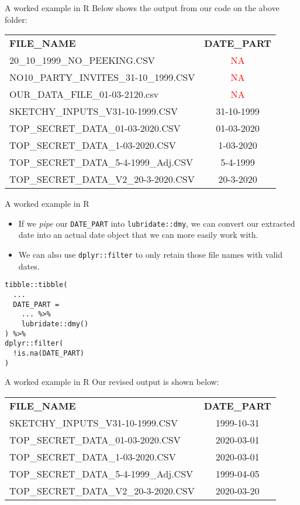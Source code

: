 \documentclass[
	usenames,
	dvipsnames,
] {beamer}
\begin{document}
\begin{frame}{A worked example in R}
	Below shows the output from our code on the above folder: \\
	\medskip
	\begin{center}
		\begin{tabular}{l c}
			\textbf{FILE\_NAME} & \textbf{DATE\_PART} \\	
			20\_10\_1999\_NO\_PEEKING.CSV & \textcolor{red}{NA} \\
			NO10\_PARTY\_INVITES\_31-10\_1999.CSV & \textcolor{red}{NA} \\
			OUR\_DATA\_FILE\_01-03-2120.csv & \textcolor{red}{NA} \\
			SKETCHY\_INPUTS\_V31-10-1999.CSV & 31-10-1999 \\
			TOP\_SECRET\_DATA\_01-03-2020.CSV & 01-03-2020 \\
			TOP\_SECRET\_DATA\_1-03-2020.CSV & 1-03-2020 \\
			TOP\_SECRET\_DATA\_5-4-1999\_Adj.CSV & 5-4-1999 \\
			TOP\_SECRET\_DATA\_V2\_20-3-2020.CSV & 20-3-2020
		\end{tabular}
	\end{center}
\end{frame}

\begin{frame}[fragile]{A worked example in R}
	\begin{itemize}[label=\textbullet]
		\item If we \emph{pipe} our \texttt{DATE\_PART} into \texttt{lubridate::dmy}, we can convert our extracted date into an actual date object that we can more easily work with.
			\pause
		\item We can also use \texttt{dplyr::filter} to only retain those file names with valid dates.
			\pause
	\end{itemize}

	\medskip
		
	\begin{lstlisting}
tibble::tibble(
  ...
  DATE_PART =
    ... %>%
    lubridate::dmy()    
) %>%
dplyr::filter(
  !is.na(DATE_PART)
)
	\end{lstlisting}
\end{frame}

\begin{frame}{A worked example in R}
	Our revised output is shown below: \\
	\medskip
	\begin{center}
		\begin{tabular}{l c}
			\textbf{FILE\_NAME} & \textbf{DATE\_PART} \\	
			SKETCHY\_INPUTS\_V31-10-1999.CSV & 1999-10-31 \\
			TOP\_SECRET\_DATA\_01-03-2020.CSV & 2020-03-01 \\
			TOP\_SECRET\_DATA\_1-03-2020.CSV & 2020-03-01 \\
			TOP\_SECRET\_DATA\_5-4-1999\_Adj.CSV & 1999-04-05 \\
			TOP\_SECRET\_DATA\_V2\_20-3-2020.CSV & 2020-03-20
		\end{tabular}
	\end{center}
\end{frame}
\end{document}

